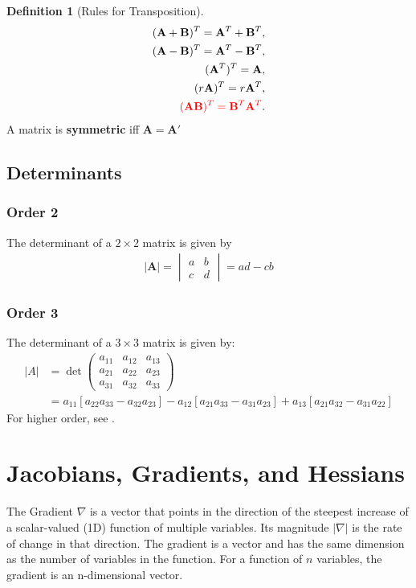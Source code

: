 \documentclass[11pt,a4paper]{book}
\newcommand{\red}[1]{\textcolor{red}{#1}}
\theoremstyle{definition}\newtheorem{definition}{Definition}
\theoremstyle{definition}\newtheorem{fact}{Fact}
\theoremstyle{definition}\newtheorem{remark}{Remark}
\theoremstyle{definition}\newtheorem{ex}{Ex.}
\theoremstyle{definition}\newtheorem{project}{Project}
\theoremstyle{definition}\newtheorem{problem}{Problem}
\theoremstyle{definition}\newtheorem{example}{Example}
\newenvironment{fdefinition}
{\begin{mdframed}\begin{definition}}
		{\end{definition}\end{mdframed}}
\numberwithin{theorem}{section}
\numberwithin{corollary}{chapter}
\numberwithin{assumption}{chapter}
\numberwithin{definition}{chapter}
\numberwithin{prop}{chapter}
\numberwithin{notation}{chapter}
\numberwithin{problem}{chapter}
\numberwithin{example}{chapter}
\numberwithin{fact}{chapter}
\numberwithin{ex}{chapter}
\def\A{\mathbf A}
\def\B{\mathbf B}
\begin{document}
\begin{appendices}
	\begin{fdefinition}[Rules for Transposition]
		\begin{align*}
			(\A+\B)^T = \A^T + \B^T,    \\
			(\A-\B)^T = \A^T - \B^T,    \\
			(\A^T)^T = \A,              \\
			(r\A)^T = r\A^T,            \\
			\red{(\A\B)^T = \B^T \A^T}. 
		\end{align*}
		A matrix is \textbf{symmetric} iff $\A = \A'$
	\end{fdefinition}
	
	\subsection{Determinants}
	\subsubsection*{Order 2}
	The determinant of a $2\times 2$ matrix is given by
	\begin{align*}
		|\A| = \begin{vmatrix}
			a & b \\ c & d
		\end{vmatrix} = ad - cb
	\end{align*}
	
	\subsubsection*{Order 3}
	The determinant of a $3\times 3$ matrix is given by:
	\begin{align*}
		|A| &= \det \begin{pmatrix}
			a_{11} & a_{12} & a_{13} \\
			a_{21} & a_{22} & a_{23} \\
			a_{31} & a_{32} & a_{33} 
		\end{pmatrix} \\
		&= a_{11} [a_{22}a_{33} - a_{32}a_{23}] 
		- a_{12}[a_{21}a_{33} - a_{31}a_{23}] 
		+ a_{13}[a_{21}a_{32} - a_{31}a_{22}]
	\end{align*}
	For higher order, see \citet[Ch. 9.4.2]{springcamp}. 
	
	\section{Jacobians, Gradients, and Hessians}
	The Gradient $\nabla$ is a vector that points in the direction of the steepest increase of a scalar-valued (1D) function of multiple variables. Its magnitude $|\nabla |$ is the rate of change in that direction. The gradient is a vector and has the same dimension as the number of variables in the function. For a function of $n$ variables, the gradient is an n-dimensional vector.
	

\end{appendices}
\end{document}
